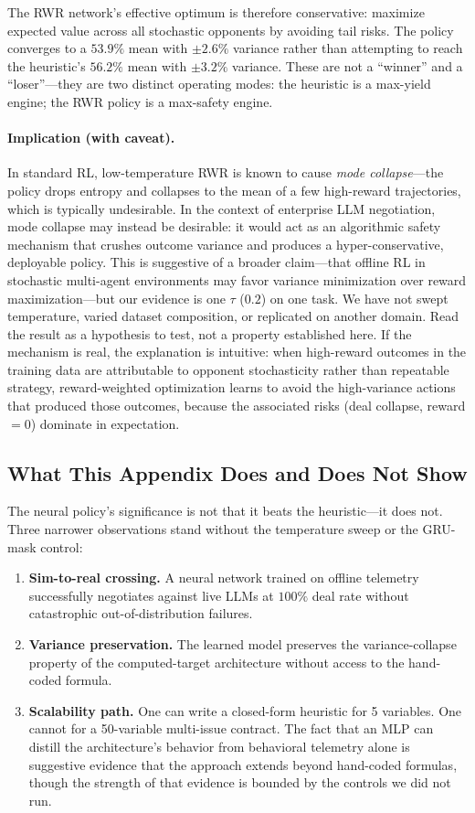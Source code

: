 \documentclass[11pt,a4paper]{article}
\begin{document}
The RWR network's effective optimum is therefore conservative: maximize expected value across all stochastic opponents by avoiding tail risks. The policy converges to a $53.9\%$ mean with $\pm 2.6\%$ variance rather than attempting to reach the heuristic's $56.2\%$ mean with $\pm 3.2\%$ variance. These are not a ``winner'' and a ``loser''---they are two distinct operating modes: the heuristic is a max-yield engine; the RWR policy is a max-safety engine.

\paragraph{Implication (with caveat).} In standard RL, low-temperature RWR is known to cause \emph{mode collapse}---the policy drops entropy and collapses to the mean of a few high-reward trajectories, which is typically undesirable. In the context of enterprise LLM negotiation, mode collapse may instead be desirable: it would act as an algorithmic safety mechanism that crushes outcome variance and produces a hyper-conservative, deployable policy. This is suggestive of a broader claim---that offline RL in stochastic multi-agent environments may favor variance minimization over reward maximization---but our evidence is one $\tau$ ($0.2$) on one task. We have not swept temperature, varied dataset composition, or replicated on another domain. Read the result as a hypothesis to test, not a property established here. If the mechanism is real, the explanation is intuitive: when high-reward outcomes in the training data are attributable to opponent stochasticity rather than repeatable strategy, reward-weighted optimization learns to avoid the high-variance actions that produced those outcomes, because the associated risks (deal collapse, reward $= 0$) dominate in expectation.

\subsection{What This Appendix Does and Does Not Show}

The neural policy's significance is not that it beats the heuristic---it does not. Three narrower observations stand without the temperature sweep or the GRU-mask control:

\begin{enumerate}
\item \textbf{Sim-to-real crossing.} A neural network trained on offline telemetry successfully negotiates against live LLMs at $100\%$ deal rate without catastrophic out-of-distribution failures.
\item \textbf{Variance preservation.} The learned model preserves the variance-collapse property of the computed-target architecture without access to the hand-coded formula.
\item \textbf{Scalability path.} One can write a closed-form heuristic for 5 variables. One cannot for a 50-variable multi-issue contract. The fact that an MLP can distill the architecture's behavior from behavioral telemetry alone is suggestive evidence that the approach extends beyond hand-coded formulas, though the strength of that evidence is bounded by the controls we did not run.
\end{enumerate}
\end{document}
